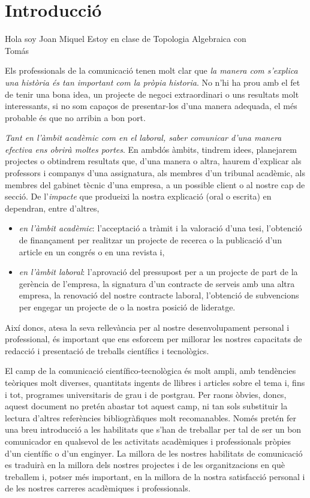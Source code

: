 
\chapter{Introducció}

Hola soy Joan Miquel
Estoy en clase de Topologia Algebraica con \\ Tomás

Els professionals de la comunicació tenen molt clar que \emph{la manera com s'explica una història és tan important com la pròpia historia}. No n'hi ha prou amb el fet de tenir una bona idea, un projecte de negoci extraordinari o uns resultats molt interessants, si no som capaços de presentar-los d'una manera adequada, el més probable és que no arribin a bon port.

\emph{Tant en l'àmbit acadèmic com en el laboral, saber comunicar d'una manera efectiva ens obrirà moltes portes}. En ambdós àmbits, tindrem idees, planejarem projectes o obtindrem resultats que, d'una manera o altra, haurem d'explicar als professors i companys d'una assignatura, als membres d'un tribunal acadèmic, als membres del gabinet tècnic d'una empresa, a un possible client o al nostre cap de secció. De l'\emph{impacte} que produeixi la nostra explicació (oral o escrita) en dependran, entre d'altres,
\begin{itemize}
 \item \emph{en l'àmbit acadèmic}: l'acceptació a tràmit i la valoració d'una tesi, l'obtenció de finançament per realitzar un projecte de recerca o la publicació d'un article en un congrés o en una revista i,
 \item \emph{en l'àmbit laboral}: l'aprovació del pressupost per a un projecte de part de la gerència de l'empresa, la signatura d'un contracte de serveis amb una altra empresa, la renovació del nostre contracte laboral, l'obtenció de subvencions per engegar un projecte de  o la nostra posició de lideratge.
\end{itemize}
Així doncs, atesa la seva rellevància per al nostre desenvolupament personal i professional, és important que ens esforcem per millorar les nostres capacitats de redacció i presentació de treballs científics i tecnològics.

El camp de la comunicació científico-tecnològica és molt ampli, amb tendències teòriques molt diverses, quantitats ingents de llibres i articles sobre el tema i, fins i tot, programes universitaris de grau i de postgrau. Per raons òbvies, doncs, aquest document no pretén abastar tot aquest camp, ni tan sols substituir la lectura d'altres referències bibliogràfiques molt recomanables. Només pretén fer una breu introducció a les habilitats que s'han de treballar per tal de ser un bon comunicador en qualsevol de les activitats acadèmiques i professionals pròpies d'un científic o d'un enginyer. La millora de les nostres habilitats de comunicació es traduirà en la millora dels nostres projectes i de les organitzacions en què treballem i, potser més important, en la millora de la nostra satisfacció personal i de les nostres carreres acadèmiques i professionals.

